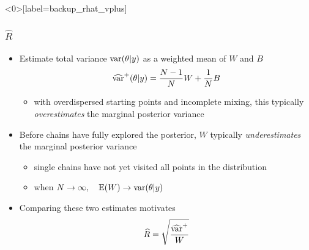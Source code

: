 \documentclass[10pt]{beamer}
\begin{document}
\begin{frame}<0>[label=backup_rhat_vplus]

\frametitle{ $\widehat{R}$}

  \begin{itemize}
  \item Estimate total variance
    $\mathrm{var}(\theta|y)$ as a weighted mean of $W$ and $B$
    \begin{equation*}
      \widehat{\mathrm{var}}^{+}(\theta|y) = \frac{N-1}{N}W+\frac{1}{N}B
    \end{equation*}
    \vspace{-0.5\baselineskip}
    \begin{itemize}
    \item with overdispersed starting points and incomplete mixing, this
      typically \emph{overestimates} the marginal posterior variance
    \end{itemize}
    \vspace{0.5\baselineskip}
  \item<2-> Before chains have fully explored the posterior, $W$ typically
    \emph{underestimates} the marginal posterior variance
    \begin{itemize}
    \item single chains have not yet visited all points in the distribution
    \item when $N\rightarrow\infty, \quad \mathrm{E}(W)\rightarrow \mathrm{var}(\theta|y)$
    \end{itemize}
    \vspace{0.5\baselineskip}
  \item<3-> Comparing these two estimates motivates
    \begin{equation*}
      \widehat{R}=\sqrt{\frac{\widehat{\mathrm{var}}^{+}}{W}}
    \end{equation*}
\end{itemize}

\end{frame}




\end{document}
